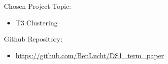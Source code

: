 \vspace*{\fill}

\large
\noindent{}Chosen Project Topic: %
\begin{itemize}
\item T3 Clustering
\end{itemize}
\noindent{}Github Repository: %
\begin{itemize}
\item \url{https://github.com/BenLucht/DS1_term_paper}
\end{itemize}